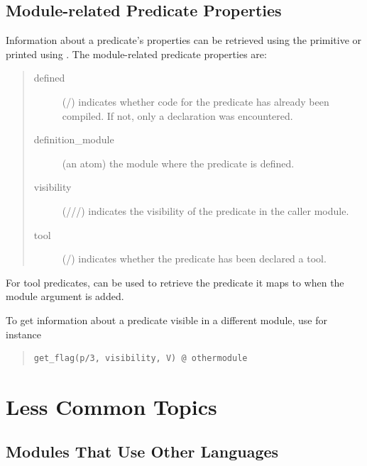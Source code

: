 \subsection{Module-related Predicate Properties}
Information about a predicate's properties can be retrieved using the
 primitive
or printed using .
The module-related predicate properties are:
\begin{quote}
\begin{description}
\item[defined]
  (/)
  indicates whether code for the predicate has already
	been compiled. If not, only a declaration was encountered.
\item[definition_module]
	(an atom) the module where the predicate is defined.
\item[visibility]
(///)
  indicates the visibility
	of the predicate in the caller module.
\item[tool]
	(/) indicates whether the predicate has been
  declared a tool.
\end{description}
\end{quote}
For tool predicates,
can be used to retrieve the predicate it maps to when the module
argument is added.

To get information about a predicate visible in a different module,
use for instance
\begin{quote}
\begin{verbatim}
get_flag(p/3, visibility, V) @ othermodule
\end{verbatim}
\end{quote}

\section{Less Common Topics}

\subsection{Modules That Use Other Languages}

